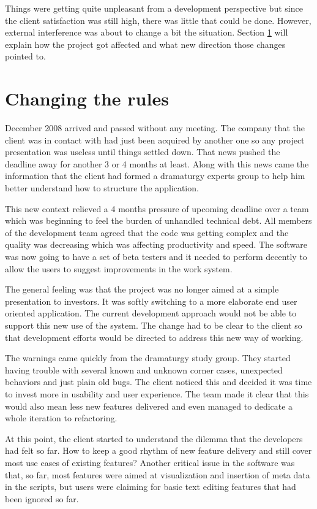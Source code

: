 \documentclass[lnbip]{svmultln}
\newcommand{\mari}[1]{\footnote{MARI: #1}}
\begin{document}
Things were getting quite unpleasant
from a development perspective but since the client
satisfaction was still high, there was little that could be
done. However, external interference was about to change a bit the
situation. Section \ref{sec:changes} will explain how the project got
affected and what new direction those changes pointed to.

\section{Changing the rules}
\label{sec:changes}

December 2008 arrived and passed without any meeting. The company that
the client was in contact with had just been acquired by another one
so any project presentation was useless until things settled
down. That news pushed the deadline away for another 3 or 4 months at
least. Along with this news came the information that the client had
formed a dramaturgy experts group to help him better understand how to
structure the application.

This new context relieved a 4 months pressure of upcoming deadline
over a team which was beginning to feel the burden of unhandled
technical debt. All members of the development team agreed that the
code was getting complex and the quality was decreasing which was
affecting productivity and speed. The software was now going to have a
set of beta testers and it needed to perform decently to allow the
users to suggest improvements in the work system.

The general feeling was that the project was no longer aimed at a
simple presentation to investors. It was softly switching to a more
elaborate end user oriented application. The current development
approach would not be able to support this new use of the system. The
change had to be clear to the client so that development efforts would
be directed to address this new way of working.

The warnings came quickly from the dramaturgy study group. They
started having trouble with several known and unknown corner cases,
unexpected behaviors and just plain old bugs. The client noticed this
and decided it was time to invest more in usability and user
experience. The team made it clear that this would also mean less new
features delivered and even managed to dedicate a whole iteration to
refactoring.

At this point, the client started to understand the dilemma that the
developers had felt so far. How to keep a good rhythm of new feature
delivery and still cover most use cases of existing features? Another
critical issue in the software was that, so far, most features were
aimed at visualization and insertion of meta data in the scripts, but
users were claiming for basic text editing features that had been
ignored so far.
\end{document}
